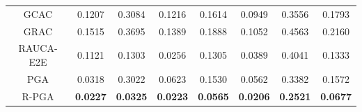 \begin{table}[t]
{\begin{tabular}{@{}c|cc|cc|cc|c@{}}
GCAC                      & 0.1207          & 0.3084          & 0.1216          & 0.1614          & 0.0949             & 0.3556            & 0.1793                    \\
GRAC                      & 0.1515          & 0.3695          & 0.1389          & 0.1888          & 0.1052             & 0.4563            & 0.2160                    \\
RAUCA-E2E                 & 0.1121          & 0.1303          & 0.0256 & 0.1305          & 0.0389             & 0.4041            & 0.1333                    \\
PGA & 0.0318 & 0.3022 & 0.0623 & 0.1530 & 0.0562 & 0.3382 & 0.1572
\\
R-PGA                     & \textbf{0.0227} & \textbf{0.0325} & \textbf{0.0223}          & \textbf{0.0565} & \textbf{0.0206}    & \textbf{0.2521}   & \textbf{0.0677}          \\ \bottomrule
\end{tabular}
}

\label{tab:main}
\end{table}